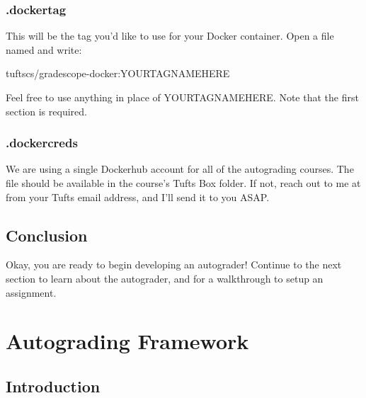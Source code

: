 \documentclass[11pt]{report}
\begin{document}
\subsection*{.dockertag}
This will be the tag you'd like to use for your Docker container. Open a file named 
and write:
\begin{bashcodeblock}
tuftscs/gradescope-docker:YOURTAGNAMEHERE      
\end{bashcodeblock}
Feel free to use anything in place of YOURTAGNAMEHERE. Note that the first section is required. 

\subsection*{.dockercreds}
We are using a single Dockerhub account for all of the autograding courses. The file
 should be available in the course's Tufts Box folder. If not, reach out to 
me at  from your Tufts email address, and I'll send it to you ASAP.

\section*{Conclusion}
Okay, you are ready to begin developing an autograder! Continue to the next section to learn 
about the autograder, and for a walkthrough to setup an assignment. 

\chapter*{Autograding Framework}
\section*{Introduction}
\end{document}
